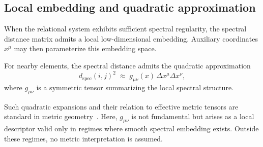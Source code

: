 \subsection{Local embedding and quadratic approximation}
  \label{subsec:local-embedding-and-quadratic-approximation}

  When the relational system exhibits sufficient spectral regularity,
  the spectral distance matrix admits a local low-dimensional embedding.
  Auxiliary coordinates $x^\mu$ may then parameterize this embedding space.

  For nearby elements, the spectral distance admits the quadratic approximation
  \begin{equation}
    d_{\mathrm{spec}}(i,j)^2
    \;\approx\;
    g_{\mu\nu}(x)\,\Delta x^\mu \Delta x^\nu ,
  \end{equation}
  where $g_{\mu\nu}$ is a symmetric tensor summarizing the local spectral structure.

  Such quadratic expansions and their relation to effective metric tensors
  are standard in metric geometry~\cite{Burago2001}.
  Here, $g_{\mu\nu}$ is not fundamental but arises as a local descriptor
  valid only in regimes where smooth spectral embedding exists.
  Outside these regimes, no metric interpretation is assumed.
